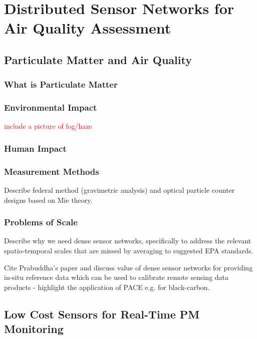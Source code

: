 \chapter{Distributed Sensor Networks for Air Quality Assessment}\label{ch:air-network}



\section{Particulate Matter and Air Quality}

\subsection{What is Particulate Matter}

\subsection{Environmental Impact}

\textcolor{red}{include a picture of fog/haze}

\subsection{Human Impact}


\subsection{Measurement Methods}

Describe federal method (gravimetric analysis) and optical particle counter
designs based on Mie theory.

\subsection{Problems of Scale}

Describe why we need dense sensor networks, specifically to address the relevant
spatio-temporal scales that are missed by averaging to suggested EPA standards.

Cite Prabuddha's paper and discuss value of dense sensor networks for providing
in-situ reference data which can be used to calibrate remote sensing data
products - highlight the application of PACE e.g. for black-carbon.

\section{Low Cost Sensors for Real-Time PM Monitoring}

